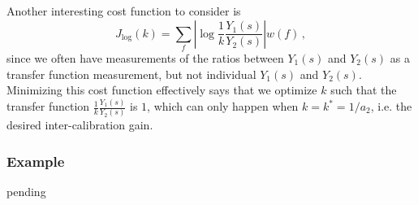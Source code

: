 Another interesting cost function to consider is
\begin{equation}
	\boxed{
		J_\mathrm{log} (k) = \sum_f \left\lvert \log \frac{1}{k}\frac{Y_1(s)}{Y_2(s)} \right\rvert w(f)\,,
	}
	\label{eqn:cost_function_inter-calibration_log}
\end{equation}
since we often have measurements of the ratios between $Y_1(s)$ and $Y_2(s)$ as a transfer function measurement, but not individual $Y_1(s)$ and $Y_2(s)$.
Minimizing this cost function effectively says that we optimize $k$ such that the transfer function $\frac{1}{k}\frac{Y_1(s)}{Y_2(s)}$ is $1$, which can only happen when $k=k^*=1/a_2$, i.e. the desired inter-calibration gain.

\subsubsection{Example}
pending




